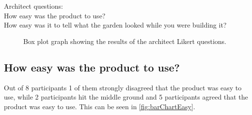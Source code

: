 Architect questions:\\
How easy was the product to use?\\
How easy was it to tell what the garden looked while you were building it?\\

\begin{figure}[H]
	\centering
{}
\caption{Box plot graph showing the results of the architect Likert questions.}
\label{fig:boxPlotResults2}
\end{figure}


\subsection*{How easy was the product to use?}
Out of 8 participants 1 of them strongly disagreed that the product was easy to use, while 2 participants hit the middle ground and 5 participants agreed that the product was easy to use. This can be seen in \autoref{fig:barChartEasy}.

